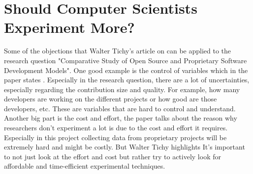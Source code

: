 \documentclass{article}
\begin{document}
\section{Should Computer Scientists Experiment More?}
Some of the objections that Walter Tichy's article on  \cite{tichy1998should} can be applied to the research question "Comparative Study of Open Source and Proprietary Software Development Models". One good example is the control of variables which in the paper states . Especially in the research question, there are a lot of uncertainties, especially regarding the contribution size and quality. For example, how many developers are working on the different projects or how good are those developers, etc. These are variables that are hard to control and understand. Another big part is the cost and effort, the paper talks about the reason why researchers don't experiment a lot is due to the cost and effort it requires. Especially in this project collecting data from proprietary projects will be extremely hard and might be costly. But Walter Tichy highlights  It's important to not just look at the effort and cost but rather try to actively look for affordable and time-efficient experimental techniques.

\hspace{0cm}
\newpage



\end{document}

